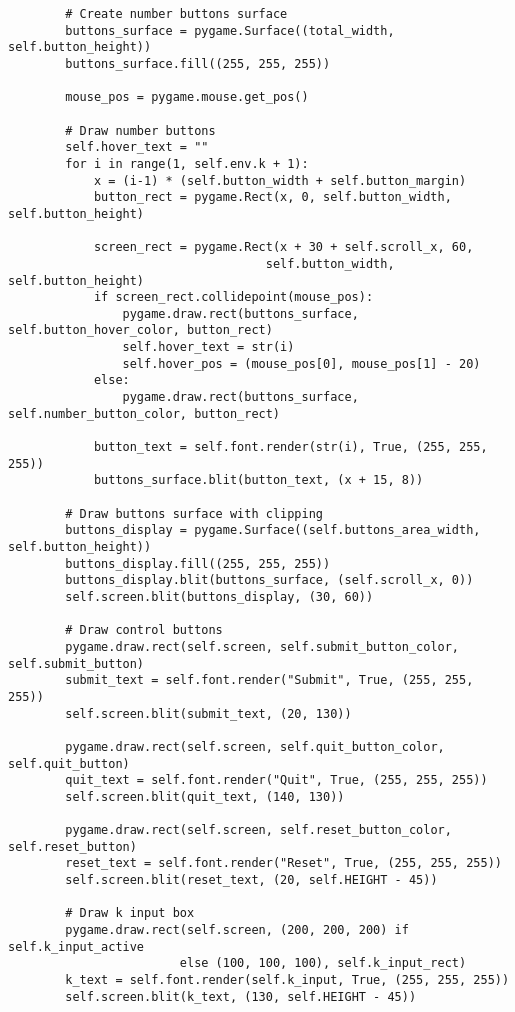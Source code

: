 \begin{lstlisting}
        # Create number buttons surface
        buttons_surface = pygame.Surface((total_width, self.button_height))
        buttons_surface.fill((255, 255, 255))
        
        mouse_pos = pygame.mouse.get_pos()
        
        # Draw number buttons
        self.hover_text = ""
        for i in range(1, self.env.k + 1):
            x = (i-1) * (self.button_width + self.button_margin)
            button_rect = pygame.Rect(x, 0, self.button_width, self.button_height)
            
            screen_rect = pygame.Rect(x + 30 + self.scroll_x, 60, 
                                    self.button_width, self.button_height)
            if screen_rect.collidepoint(mouse_pos):
                pygame.draw.rect(buttons_surface, self.button_hover_color, button_rect)
                self.hover_text = str(i)
                self.hover_pos = (mouse_pos[0], mouse_pos[1] - 20)
            else:
                pygame.draw.rect(buttons_surface, self.number_button_color, button_rect)
            
            button_text = self.font.render(str(i), True, (255, 255, 255))
            buttons_surface.blit(button_text, (x + 15, 8))
        
        # Draw buttons surface with clipping
        buttons_display = pygame.Surface((self.buttons_area_width, self.button_height))
        buttons_display.fill((255, 255, 255))
        buttons_display.blit(buttons_surface, (self.scroll_x, 0))
        self.screen.blit(buttons_display, (30, 60))
        
        # Draw control buttons
        pygame.draw.rect(self.screen, self.submit_button_color, self.submit_button)
        submit_text = self.font.render("Submit", True, (255, 255, 255))
        self.screen.blit(submit_text, (20, 130))
        
        pygame.draw.rect(self.screen, self.quit_button_color, self.quit_button)
        quit_text = self.font.render("Quit", True, (255, 255, 255))
        self.screen.blit(quit_text, (140, 130))
        
        pygame.draw.rect(self.screen, self.reset_button_color, self.reset_button)
        reset_text = self.font.render("Reset", True, (255, 255, 255))
        self.screen.blit(reset_text, (20, self.HEIGHT - 45))
        
        # Draw k input box
        pygame.draw.rect(self.screen, (200, 200, 200) if self.k_input_active 
                        else (100, 100, 100), self.k_input_rect)
        k_text = self.font.render(self.k_input, True, (255, 255, 255))
        self.screen.blit(k_text, (130, self.HEIGHT - 45))
        

\end{lstlisting}
